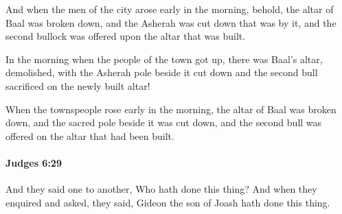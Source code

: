 			\begin{versebox}
					\item[BHS] 
					\item[ASV] And when the men of the city arose early in the morning, behold, the altar of Baal was broken down, and the Asherah was cut down that was by it, and the second bullock was offered upon the altar that was built.
					\item[NIV] In the morning when the people of the town got up, there was Baal’s altar, demolished, with the Asherah pole beside it cut down and the second bull sacrificed on the newly built altar!
					\item[NRSV] When the townspeople rose early in the morning, the altar of Baal was broken down, and the sacred pole beside it was cut down, and the second bull was offered on the altar that had been built.
			\end{versebox}

		\paragraph{Judges 6:29} %
			\label{JUDGES-6-29}

			And they said one to another, Who hath done this thing? And when they enquired and asked, they said, Gideon the son of Joash hath done this thing.

